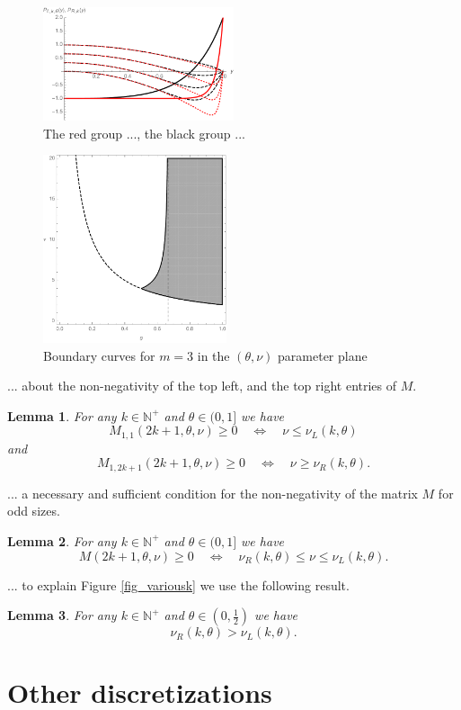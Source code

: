 \documentclass[a4paper]{article}
\newtheorem{lemma}{Lemma}
\newcommand{\te}{\theta}
\newcommand{\nul}{\nu_L(k,\theta)}
\newcommand{\nur}{\nu_R(k,\theta)}
\newcommand{\nplus}{\mathbb{N}^+}
\begin{document}
\begin{figure}
\begin{center}
\includegraphics[width=0.5\textwidth]{fig_someplpr.pdf}
\caption{The red group ..., the black group ...}\label{fig_someplpr}
\end{center}
\end{figure}

\begin{figure}
\begin{center}
\includegraphics[width=0.48\textwidth]{fig_boundary.pdf}
\caption{Boundary curves for $m=3$ in the $(\te,\nu)$ parameter plane}\label{fig_boundary}
\end{center}
\end{figure}

... about the non-negativity of the top left, and the top right entries of $M$.
\begin{lemma}
For any $k\in\nplus$ and $\te\in(0,1]$ we have 
\[
M_{1,1}(2k+1,\te,\nu)\ge 0 \quad \Longleftrightarrow \quad \nu\le\nul
\] 
and
\[
M_{1,2k+1}(2k+1,\te,\nu)\ge 0 \quad \Longleftrightarrow \quad \nu\ge\nur.
\] 
\end{lemma}


... a necessary and sufficient condition for the non-negativity of the matrix $M$ for odd sizes.
\begin{lemma}
For any $k\in\nplus$ and $\te\in(0,1]$ we have 
\[
M(2k+1,\te,\nu)\ge 0 \quad \Longleftrightarrow \quad \nur\le\nu\le\nul.
\] 
\end{lemma}

... to explain Figure \ref{fig_variousk} we use the following result.
\begin{lemma}
For any $k\in\nplus$ and $\te\in\left(0,\frac{1}{2}\right)$ we have 
\[
 \nur>\nul.
\] 
\end{lemma}

\section{Other discretizations}
\end{document}
